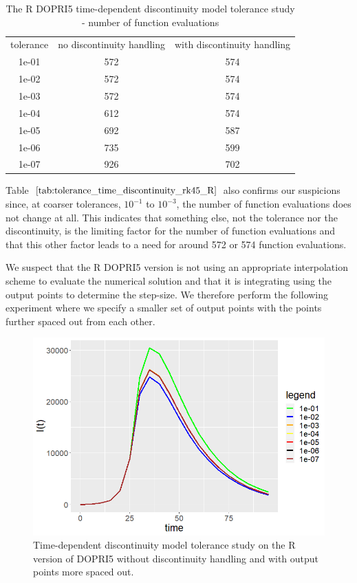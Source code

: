 \begin{table}[H]
\caption {The R DOPRI5 time-dependent discontinuity model tolerance study - number of function evaluations} \label{tab:tolerance_time_discontinuity_rk45_R} 
\begin{center}
\begin{tabular}{ c c c }
tolerance & no discontinuity handling & with discontinuity handling\\ 
1e-01 & 572 & 574 \\
1e-02 & 572 & 574 \\
1e-03 & 572 & 574 \\
1e-04 & 612 & 574 \\
1e-05 & 692 & 587 \\
1e-06 & 735 & 599 \\
1e-07 & 926 & 702 \\
\end{tabular}
\end{center}
\end{table}

Table $\ref{tab:tolerance_time_discontinuity_rk45_R}$ also confirms our suspicions since, at coarser tolerances, $10^{-1}$ to $10^{-3}$, the number of function evaluations does not change at all. This indicates that something else, not the tolerance nor the discontinuity, is the limiting factor for the number of function evaluations and that this other factor leads to a need for around 572 or 574 function evaluations.

We suspect that the R DOPRI5 version is not using an appropriate interpolation scheme to evaluate the numerical solution and that it is integrating using the output points to determine the step-size. We therefore perform the following experiment where we specify a smaller set of output points with the points further spaced out from each other.

\begin{figure}[H]
\centering
\includegraphics[width=0.7\linewidth]{./figures/tolerance_time_rk45_further_no_event_R}
\caption{Time-dependent discontinuity model tolerance study on the R version of DOPRI5 without discontinuity handling and with output points more spaced out.}
\label{fig:tolerance_time_rk45_further_no_event_R}
\end{figure}

